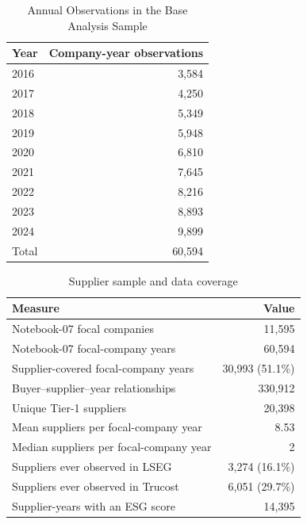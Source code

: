 \begin{table}[!htbp]
\centering
\caption{Annual Observations in the Base Analysis Sample}
\label{tab:sample_count}
\begin{tabular}{@{}lr@{}}
\toprule
Year & Company-year observations \\
\midrule
2016 & 3,584 \\
2017 & 4,250 \\
2018 & 5,349 \\
2019 & 5,948 \\
2020 & 6,810 \\
2021 & 7,645 \\
2022 & 8,216 \\
2023 & 8,893 \\
2024 & 9,899 \\
\midrule
Total & 60,594 \\
\bottomrule
\end{tabular}
\end{table}

\begin{table}[!htbp]
\centering
\caption{Supplier sample and data coverage}
\label{tab:supplier_sample}
\begin{tabular}{lr}
\toprule
Measure & Value \\
\midrule
Notebook-07 focal companies & 11,595 \\
Notebook-07 focal-company years & 60,594 \\
Supplier-covered focal-company years & 30,993 (51.1\%) \\
Buyer--supplier--year relationships & 330,912 \\
Unique Tier-1 suppliers & 20,398 \\
Mean suppliers per focal-company year & 8.53 \\
Median suppliers per focal-company year & 2 \\
Suppliers ever observed in LSEG & 3,274 (16.1\%) \\
Suppliers ever observed in Trucost & 6,051 (29.7\%) \\
Supplier-years with an ESG score & 14,395 \\
\bottomrule
\end{tabular}
\end{table}

